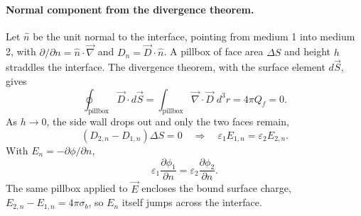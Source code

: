 \paragraph{Normal component from the divergence theorem.}
Let $\hat n$ be the unit normal to the interface, pointing from medium 1 into medium 2, with $\partial/\partial n = \hat n\cdot\vec\nabla$ and $D_n = \vec D\cdot\hat n$. A pillbox of face area $\Delta S$ and height $h$ straddles the interface. The divergence theorem, with the surface element $d\vec S$, gives
\begin{equation*}
    \oint_{\text{pillbox}} \vec D\cdot d\vec S = \int_{\text{pillbox}} \vec\nabla\cdot\vec D\;d^3r = 4\pi Q_f = 0.
\end{equation*}
As $h \to 0$, the side wall drops out and only the two faces remain,
\begin{equation*}
    \left(D_{2,n} - D_{1,n}\right)\Delta S = 0
    \quad\Rightarrow\quad
    \varepsilon_1 E_{1,n} = \varepsilon_2 E_{2,n}.
\end{equation*}
With $E_n = -\partial\phi/\partial n$,
\begin{equation}
    \boxed{
    \varepsilon_1\frac{\partial\phi_1}{\partial n} = \varepsilon_2\frac{\partial\phi_2}{\partial n}.
    }
\end{equation}
The same pillbox applied to $\vec E$ encloses the bound surface charge, $E_{2,n} - E_{1,n} = 4\pi\sigma_b$, so $E_n$ itself jumps across the interface.

